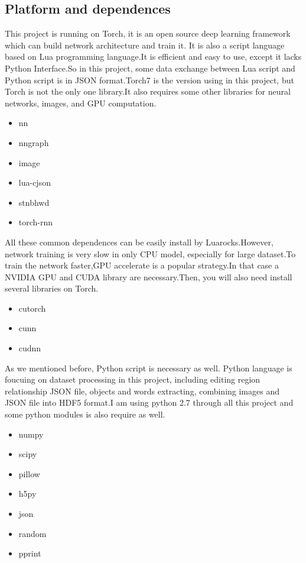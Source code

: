 \documentclass[12pt,a4paper]{report}
\begin{document}
\subsection{Platform and dependences \cite{dec}}
This project is running on Torch, it is an open source deep learning framework which can build network architecture and train it. It is also a script language based on Lua programming language.It is efficient and easy to use, except it lacks Python Interface.So in this project, some data exchange between Lua script and Python script is in JSON format.Torch7 is the version using in this project, but Torch is not the only one library.It also requires some other libraries for neural networks, images, and GPU computation.

\begin{itemize}
\item nn
\item nngraph
\item image
\item lua-cjson
\item stnbhwd
\item torch-rnn
\end{itemize}
All these common dependences can be easily install by Luarocks.However, network training is very slow in only CPU model, especially for large dataset.To train the network faster,GPU accelerate is a popular strategy.In that case a NVIDIA GPU and CUDA library  are necessary.Then, you will also need  install several libraries on Torch.
\begin{itemize}
\item cutorch
\item cunn
\item cudnn
\end{itemize}
As we mentioned before, Python script  is necessary as well. Python language is foucuing on dataset processing in this project, including editing region relationship JSON file, objects and words extracting, combining images and JSON file into HDF5 format.I am using python 2.7 through all this project and some python modules is also require as well.
\begin{itemize}
\item numpy
\item scipy
\item pillow
\item h5py
\item json
\item random
\item pprint
\end{itemize}
\end{document}
